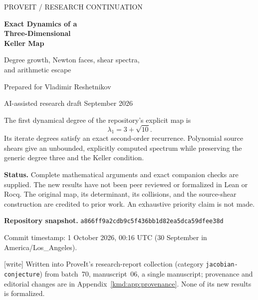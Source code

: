 \documentclass[11pt,a4paper]{article}
\numberwithin{equation}{section}
\theoremstyle{definition}
\theoremstyle{remark}
\newcommand{\wtag}{\textup{[write]}}%
\begin{document}
\hypersetup{pageanchor=false}
\begin{titlepage}
\thispagestyle{empty}
\vspace*{12mm}
{\sffamily\large PROVEIT \; / \; RESEARCH CONTINUATION\par}
\vspace{15mm}
{\Huge\bfseries Exact Dynamics of a\\[3mm] Three-Dimensional\\[3mm] Keller Map\par}
\vspace{9mm}
{\Large Degree growth, Newton faces, shear spectra,\\[2mm]
and arithmetic escape\par}
\vspace{12mm}
{\large Prepared for Vladimir Reshetnikov\par}
{\normalsize AI-assisted research draft \;\textbullet{} September 2026\par}
\vspace{12mm}
\begin{resultbox}
The first dynamical degree of the repository's explicit map is
\[
\boxed{\lambda_1=3+\sqrt{10}}.
\]
Its iterate degrees satisfy an exact second-order recurrence. Polynomial
source shears give an unbounded, explicitly computed spectrum while
preserving the generic degree three and the Keller condition.
\end{resultbox}
\vfill
\noindent\textbf{Status.} Complete mathematical arguments and exact companion
checks are supplied. The new results have not been peer reviewed or
formalized in Lean or Rocq. The original map, its determinant, its
collisions, and the source-shear construction are credited to prior work.
An exhaustive priority claim is not made.\par
\vspace{5mm}
\noindent\textbf{Repository snapshot.}\quad
\texttt{a866ff9a2cdb9c5f436bb1d82ea5dca59dfee38d}\par
\noindent\small Commit timestamp: 1 October 2026, 00:16 UTC
(30 September in America/Los\_Angeles).\par
\vspace{3mm}
\noindent\small\wtag{} Written into ProveIt's research-report collection
(category \texttt{jacobian-conjecture}) from batch~70, manuscript~06, a
single manuscript; provenance and editorial changes are in
Appendix~\ref{kmd:app:provenance}. None of its new results is formalized.
\end{titlepage}
\hypersetup{pageanchor=true}
\end{document}
